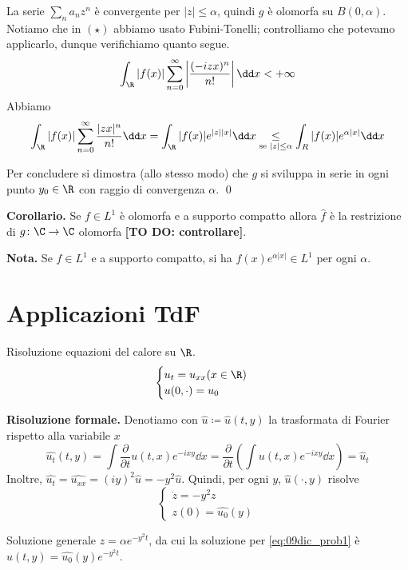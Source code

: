 La serie $\sum_n a_n z^n$ è convergente per $|z| \leq \alpha$, quindi $g$ è olomorfa su $B(0,\alpha)$.
Notiamo che in $(\star)$ abbiamo usato Fubini-Tonelli; controlliamo che potevamo applicarlo, dunque verifichiamo quanto segue.
%
$$
	\int_{\R} |f(x)| \sum_{n=0}^{\infty} \left| \frac{(-izx)^n}{n!} \right| \dd x < + \infty
$$
%
Abbiamo
%
$$
	\int_\R |f(x)| \sum_{n=0}^{\infty} \frac{|zx|^n}{n!} \dd x
	= \int_\R |f(x)| e^{|z| |x|} \dd x
	\underset{\text{se } |z| \leq \alpha}{\leq} \int_R |f(x)| e^{\alpha |x|} \dd x
$$
%

Per concludere si dimostra (allo stesso modo) che $g$ si sviluppa in serie in ogni punto $y_0 \in \R$ con raggio di convergenza $\alpha$.
\qed

\vs

\textbf{Corollario.} Se $f \in L^1$ è olomorfa e a supporto compatto allora $\hat{f}$ è la restrizione di $g \colon \C \to \C$ olomorfa \textbf{[TO DO: controllare]}.

\textbf{Nota.} Se $f \in L^1$ e a supporto compatto, si ha $f(x) e^{\alpha |x|} \in L^1$ per ogni $\alpha$.

\section{Applicazioni TdF}

Risoluzione equazioni del calore su $\R$.
%
$$
\begin{cases}
u_t = u_{xx} (x \in \R) \\
u(0,\cdot) = u_0
\end{cases} 
$$
%

\textbf{Risoluzione formale.}
Denotiamo con $\hat{u} \coloneqq \hat{u}(t,y)$ la trasformata di Fourier rispetto alla variabile $x$ 
%
$$
\hat{u_t}(t,y) = \int \frac{\partial}{\partial t} u(t,x) e^{-ixy} \dd x 
	= \frac{\partial}{\partial t} \left( \int u(t,x) e^{-ixy} \dd x \right) = \hat{u}_t
$$
%
Inoltre, $\hat{u_t} = \hat{u_{xx}} = (iy)^2 \hat{u} = -y^2\hat{u}$.
Quindi, per ogni $y$, $\hat{u}(\cdot,y)$ risolve
%
\begin{equation}
\label{eq:09dic_prob1}\tag{P}
\begin{cases}
	\dot z = -y^2 z \\
	z(0) = \hat{u_0}(y)
\end{cases} 
\end{equation}

Soluzione generale $z = \alpha e^{-y^2 t}$, da cui la soluzione per \eqref{eq:09dic_prob1} è $\hat{u}(t,y) = \hat{u_0}(y) e^{-y^2 t}$.

